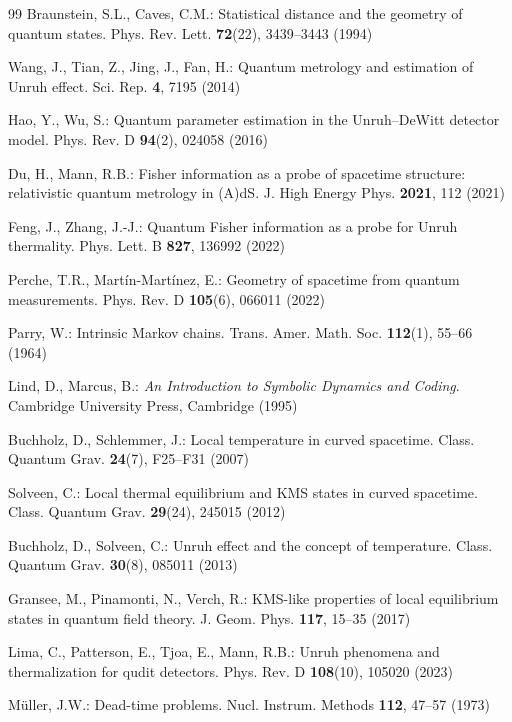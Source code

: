 \begin{thebibliography}{99}
Braunstein, S.L., Caves, C.M.: Statistical distance and the geometry of quantum states. Phys. Rev. Lett. \textbf{72}(22), 3439--3443 (1994)

Wang, J., Tian, Z., Jing, J., Fan, H.: Quantum metrology and estimation of Unruh effect. Sci. Rep. \textbf{4}, 7195 (2014)

Hao, Y., Wu, S.: Quantum parameter estimation in the Unruh--DeWitt detector model. Phys. Rev. D \textbf{94}(2), 024058 (2016)

Du, H., Mann, R.B.: Fisher information as a probe of spacetime structure: relativistic quantum metrology in (A)dS. J. High Energy Phys. \textbf{2021}, 112 (2021)

Feng, J., Zhang, J.-J.: Quantum Fisher information as a probe for Unruh thermality. Phys. Lett. B \textbf{827}, 136992 (2022)

Perche, T.R., Mart\'in-Mart\'inez, E.: Geometry of spacetime from quantum measurements. Phys. Rev. D \textbf{105}(6), 066011 (2022)

Parry, W.: Intrinsic Markov chains. Trans. Amer. Math. Soc. \textbf{112}(1), 55--66 (1964)

Lind, D., Marcus, B.: \emph{An Introduction to Symbolic Dynamics and Coding}. Cambridge University Press, Cambridge (1995)

Buchholz, D., Schlemmer, J.: Local temperature in curved spacetime. Class. Quantum Grav. \textbf{24}(7), F25--F31 (2007)

Solveen, C.: Local thermal equilibrium and KMS states in curved spacetime. Class. Quantum Grav. \textbf{29}(24), 245015 (2012)

Buchholz, D., Solveen, C.: Unruh effect and the concept of temperature. Class. Quantum Grav. \textbf{30}(8), 085011 (2013)

Gransee, M., Pinamonti, N., Verch, R.: KMS-like properties of local equilibrium states in quantum field theory. J. Geom. Phys. \textbf{117}, 15--35 (2017)

Lima, C., Patterson, E., Tjoa, E., Mann, R.B.: Unruh phenomena and thermalization for qudit detectors. Phys. Rev. D \textbf{108}(10), 105020 (2023)

M\"uller, J.W.: Dead-time problems. Nucl. Instrum. Methods \textbf{112}, 47--57 (1973)


\end{thebibliography}
